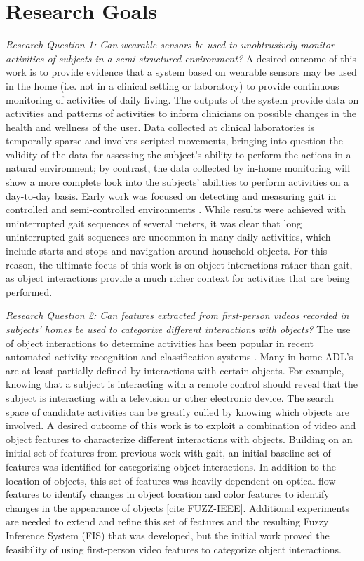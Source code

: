 \documentclass[12pt]{report}
\begin{document}
\section{Research Goals}
\emph{Research Question 1: Can wearable sensors be used to unobtrusively monitor activities of subjects in a semi-structured environment?}
A desired outcome of this work is to provide evidence that a system based on wearable sensors may be used in the home (i.e. not in a clinical setting or laboratory) to provide continuous monitoring of activities of daily living. The outputs of the system provide data on activities and patterns of activities to inform clinicians on possible changes in the health and wellness of the user. Data collected at clinical laboratories is temporally sparse and involves scripted movements, bringing into question the validity of the data for assessing the subject’s ability to perform the actions in a natural environment; by contrast, the data collected by in-home monitoring will show a more complete look into the subjects’ abilities to perform activities on a day-to-day basis.
Early work was focused on detecting and measuring gait in controlled and semi-controlled environments \cite{Schneider2017PreliminaryProcessing, Schneider2019ComparisonEnvironments}. While results were achieved with uninterrupted gait sequences of several meters, it was clear that long uninterrupted gait sequences are uncommon in many daily activities, which include starts and stops and navigation around household objects. For this reason, the ultimate focus of this work is on object interactions rather than gait, as object interactions provide a much richer context for activities that are being performed.

\emph{Research Question 2: Can features extracted from first-person videos recorded in subjects’ homes be used to categorize different interactions with objects?}
The use of object interactions to determine activities has been popular in recent automated activity recognition and classification systems \cite{Pirsiavash2012, Sudhakaran2018, Nakatani2018PreliminaryKnowledge, Wang2018, Gokce2019HumanPairs}. Many in-home ADL’s are at least partially defined by interactions with certain objects. For example, knowing that a subject is interacting with a remote control should reveal that the subject is interacting with a television or other electronic device. The search space of candidate activities can be greatly culled by knowing which objects are involved. A desired outcome of this work is to exploit a combination of video and object features to characterize different interactions with objects.
Building on an initial set of features from previous work with gait, an initial baseline set of features was identified for categorizing object interactions. In addition to the location of objects, this set of features was heavily dependent on optical flow features to identify changes in object location and color features to identify changes in the appearance of objects [cite FUZZ-IEEE]. Additional experiments are needed to extend and refine this set of features and the resulting Fuzzy Inference System (FIS) that was developed, but the initial work proved the feasibility of using first-person video features to categorize object interactions.
\end{document}
